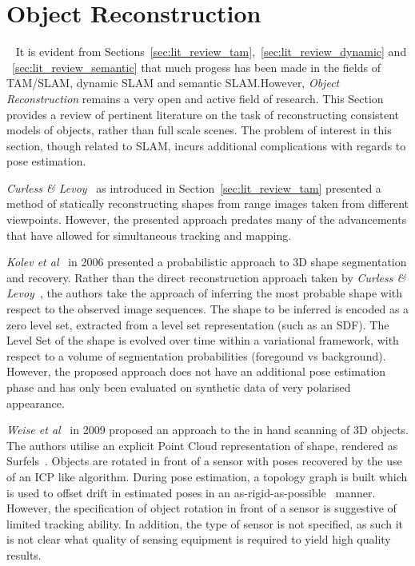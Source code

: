 \section{Object Reconstruction}
~\label{sec:lit_review_obj_recon}
It is evident from Sections~\ref{sec:lit_review_tam},~\ref{sec:lit_review_dynamic} and 
~\ref{sec:lit_review_semantic} that much progess has been made in the fields of TAM/SLAM, 
dynamic SLAM and semantic SLAM.\@ However, \textit{Object Reconstruction} remains a very open 
and active field of research. This Section provides a review of pertinent literature on the 
task of reconstructing consistent models of objects, rather than full scale scenes. The problem of 
interest in this section, though related to SLAM, incurs additional complications with regards 
to pose estimation.

\textit{Curless \& Levoy}~\cite{Curless1996} as introduced in Section~\ref{sec:lit_review_tam} 
presented a method of statically reconstructing shapes from range images taken from different 
viewpoints. However, the presented approach predates many of the advancements that have allowed 
for simultaneous tracking and mapping.

\textit{Kolev et al}~\cite{Kolev2006} in 2006 presented a probabilistic approach to 3D shape 
segmentation and recovery. Rather than the direct reconstruction approach taken by 
\textit{Curless \& Levoy}~\cite{Curless1996}, the authors take the approach of inferring the most 
probable shape with respect to the observed image sequences. The shape to be inferred is encoded as a 
zero level set, extracted from a level set representation (such as an SDF). The Level Set of the shape is 
evolved over time within a variational framework, with respect to a volume of segmentation 
probabilities (foregound vs background). However, the proposed approach does not have an additional pose 
estimation phase and has only been evaluated on synthetic data of very polarised appearance.

\textit{Weise et al}~\cite{Weise2009} in 2009 proposed an approach to the in hand scanning of 3D objects. 
The authors utilise an explicit Point Cloud representation of shape, rendered as Surfels~\cite{Pfister2000}. 
Objects are rotated in front of a sensor with poses recovered by the use of an ICP like algorithm. During 
pose estimation, a topology graph is built which is used to offset drift in estimated poses in an 
as-rigid-as-possible~\cite{Igarashi2005} manner. However, the specification of object rotation in front of 
a sensor is suggestive of limited tracking ability. In addition, the type of sensor is not specified, 
as such it is not clear what quality of sensing equipment is required to yield high quality results.

